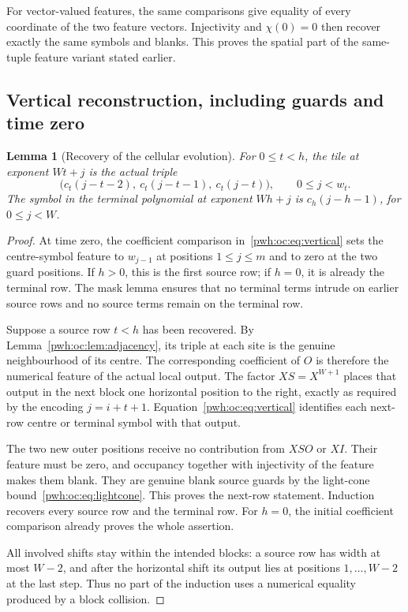 \documentclass[11pt,letterpaper]{article}
\numberwithin{equation}{section}
\newtheorem{lemma}[theorem]{Lemma}
\theoremstyle{definition}
\begin{document}
For vector-valued features, the same comparisons give equality of every
coordinate of the two feature vectors. Injectivity and $\chi(0)=0$
then recover exactly the same symbols and blanks. This proves the
spatial part of the same-tuple feature variant stated earlier.

\subsection{Vertical reconstruction, including guards and time zero}

\begin{lemma}[Recovery of the cellular evolution]
\label{pwh:oc:lem:evolution}
For $0\le t<h$, the tile at exponent $Wt+j$ is the actual triple
\[
 \bigl(c_t(j-t-2),\ c_t(j-t-1),\ c_t(j-t)\bigr),
 \qquad 0\le j<w_t.
\]
The symbol in the terminal polynomial at exponent $Wh+j$ is
$c_h(j-h-1)$, for $0\le j<W$.
\end{lemma}

\begin{proof}
At time zero, the coefficient comparison in~\eqref{pwh:oc:eq:vertical} sets
the centre-symbol feature to $w_{j-1}$ at positions $1\le j\le m$
and to zero at the two guard positions. If $h>0$, this is the first
source row; if $h=0$, it is already the terminal row. The mask lemma
ensures that no terminal terms intrude on earlier source rows and no
source terms remain on the terminal row.

Suppose a source row $t<h$ has been recovered. By
Lemma~\ref{pwh:oc:lem:adjacency}, its triple at each site is the genuine
neighbourhood of its centre. The corresponding coefficient of $O$ is
therefore the numerical feature of the actual local output. The factor
$XS=X^{W+1}$ places that output in the next block one horizontal
position to the right, exactly as required by the encoding
$j=i+t+1$. Equation~\eqref{pwh:oc:eq:vertical} identifies each next-row
centre or terminal symbol with that output.

The two new outer positions receive no contribution from $XSO$ or $XI$.
Their feature must be zero, and occupancy together with injectivity of the
feature makes them blank. They are genuine blank source guards by the
light-cone bound~\eqref{pwh:oc:eq:lightcone}. This proves the next-row statement.
Induction recovers every source row and the terminal row. For $h=0$,
the initial coefficient comparison already proves the whole assertion.

All involved shifts stay within the intended blocks: a source row has
width at most $W-2$, and after the horizontal shift its output lies at
positions $1,\ldots,W-2$ at the last step. Thus no part of the induction
uses a numerical equality produced by a block collision.
\end{proof}
\end{document}
